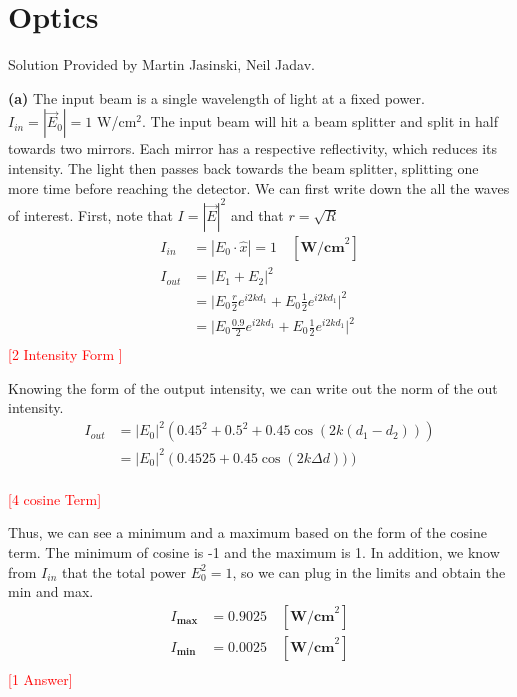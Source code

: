 \chapter{Optics}
\newpage
\begin{problem}
	Solution Provided by Martin Jasinski, Neil Jadav. %
\end{problem}
\begin{solution}
	\textbf{(a)}
	The input beam is a single wavelength of light at a fixed power. $I_{in} = |\vec E_0| = 1$ W/cm$^2$. The input beam will hit a beam splitter and split in half towards two mirrors. Each mirror has a respective reflectivity, which reduces its intensity. The light then passes back towards the beam splitter, splitting one more time before reaching the detector. We can first write down the all the waves of interest. First, note that $I = |\vec E|^2$ and that $r = \sqrt{R}$
	\begin{align}
		I_{in} &= |E_0 \cdot \hat x| = 1 \quad [\textbf{W/cm}^2] \\
		I_{out} &= |E_1 + E_2|^2\\
		&= \bigg|E_0 \frac{r}{2}e^{i2kd_1} + E_0 \frac{1}{2}e^{i2kd_1}\bigg|^2\\
		&= \bigg|E_0 \frac{0.9}{2}e^{i2kd_1} + E_0 \frac{1}{2}e^{i2kd_1}\bigg|^2\\
	\end{align}
	\textcolor{red}{[2 Intensity Form ]}

	Knowing the form of the output intensity, we can write out the norm of the out intensity. 
	\begin{align*}
		I_{out} &= |E_0|^2\left( 0.45^2 + 0.5^2  + 0.45 \cos(2k(d_1- d_2))\right) \\
			    &= |E_0|^2\left( 0.4525 + 0.45  \cos(2k\Delta d))\right) \\
	\end{align*} 

	\textcolor{red}{[4 cosine Term]}

	Thus, we can see a minimum and a maximum based on the form of the cosine term. The minimum of cosine is -1 and the maximum is 1. In addition, we know from $I_{in}$ that the total power $E_0^2 = 1$, so we can plug in the limits and obtain the min and max.  
	\begin{equation}
		\boxed{
			\begin{aligned}
				I_{\textbf{max}} &= 0.9025 \quad [\textbf{W/cm}^2] \\
				I_{\textbf{min}} &= 0.0025 \quad [\textbf{W/cm}^2] \\
			\end{aligned}
		}
	\end{equation}
	\textcolor{red}{[1 Answer]}


\end{solution}

